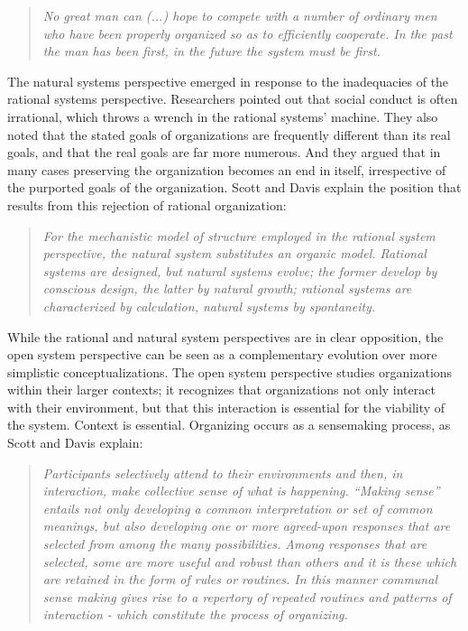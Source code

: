 \begin{quote}
\emph{No great man can (...) hope to compete with a number of ordinary men who have been properly organized so as to efficiently cooperate. In the past the man has been first, in the future the system must be first.} \cite{Taylor1947}
\end{quote}

The natural systems perspective emerged in response to the inadequacies of the rational systems perspective. Researchers pointed out that social conduct is often irrational, which throws a wrench in the rational systems' machine. They also noted that the stated goals of organizations are frequently different than its real goals, and that the real goals are far more numerous. And they argued that in many cases preserving the organization becomes an end in itself, irrespective of the purported goals of the organization. Scott and Davis explain the position that results from this rejection of rational organization:

\begin{quote}
\emph{For the mechanistic model of structure employed in the rational system perspective, the natural system substitutes an organic model. Rational systems are designed, but natural systems evolve; the former develop by conscious design, the latter by natural growth; rational systems are characterized by calculation, natural systems by spontaneity.}
\end{quote}

While the rational and natural system perspectives are in clear opposition, the open system perspective can be seen as a complementary evolution over more simplistic conceptualizations. The open system perspective studies organizations within their larger contexts; it recognizes that organizations not only interact with their environment, but that this interaction is essential for the viability of the system. Context is essential. Organizing occurs as a sensemaking process, as Scott and Davis explain:

\begin{quote}
\emph{Participants selectively attend to their environments and then, in interaction, make collective sense of what is happening. ``Making sense'' entails not only developing a common interpretation or set of common meanings, but also developing one or more agreed-upon responses that are selected from among the many possibilities. Among responses that are selected, some are more useful and robust than others and it is these which are retained in the form of rules or routines. In this manner communal sense making gives rise to a repertory of repeated routines and patterns of interaction - which constitute the process of organizing.}
\end{quote}

